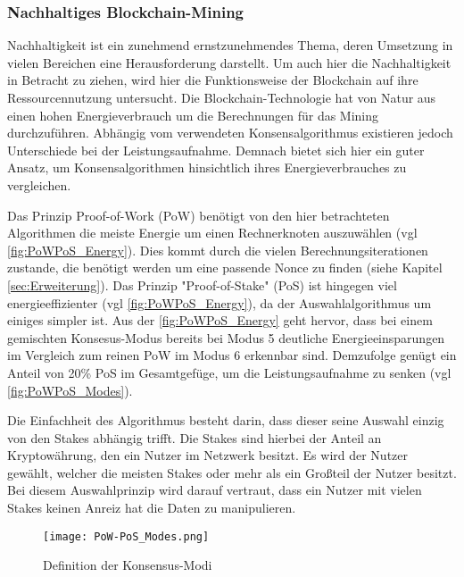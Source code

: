 \subsubsection{Nachhaltiges Blockchain-Mining}
Nachhaltigkeit ist ein zunehmend ernstzunehmendes Thema, deren Umsetzung in vielen Bereichen eine 
Herausforderung darstellt. Um auch hier die Nachhaltigkeit in Betracht zu ziehen, wird hier die 
Funktionsweise der Blockchain auf ihre Ressourcennutzung untersucht. 
Die Blockchain-Technologie hat von Natur aus einen hohen Energieverbrauch um die Berechnungen für das 
Mining durchzuführen. Abhängig vom verwendeten Konsensalgorithmus existieren jedoch Unterschiede bei 
der Leistungsaufnahme. 
\cite[p.~2]{Athar2024BC_Sustainability}
Demnach bietet sich hier ein guter Ansatz, um Konsensalgorithmen hinsichtlich ihres Energieverbrauches
zu vergleichen.

Das Prinzip \glqq Proof-of-Work\grqq{} (PoW) benötigt von den hier betrachteten Algorithmen die meiste 
Energie um einen Rechnerknoten auszuwählen (vgl \autoref{fig:PoWPoS_Energy}). Dies kommt durch die vielen 
Berechnungsiterationen zustande, die benötigt werden um eine passende Nonce zu finden 
(siehe Kapitel \ref{sec:Erweiterung}).
\newline
Das Prinzip "Proof-of-Stake" (PoS) ist hingegen viel energieeffizienter 
(vgl \autoref{fig:PoWPoS_Energy}), da der Auswahlalgorithmus um einiges simpler ist.
Aus der \autoref{fig:PoWPoS_Energy} geht hervor, dass bei einem gemischten Konsesus-Modus bereits bei 
Modus 5 deutliche Energieeinsparungen im Vergleich zum reinen PoW im Modus 6 erkennbar sind. Demzufolge genügt ein Anteil von 20\% PoS im 
Gesamtgefüge, um die Leistungsaufnahme zu senken (vgl \autoref{fig:PoWPoS_Modes}).

Die Einfachheit des Algorithmus besteht darin, dass dieser seine Auswahl einzig von den Stakes abhängig
trifft. Die Stakes sind hierbei der Anteil an Kryptowährung, den ein Nutzer im Netzwerk besitzt.
Es wird der Nutzer gewählt, welcher die meisten Stakes oder mehr als ein Gro\ss teil der Nutzer besitzt.
Bei diesem Auswahlprinzip wird darauf vertraut, dass ein Nutzer mit vielen Stakes keinen Anreiz hat die
Daten zu manipulieren.
\cite[p.280]{Nair2021Energy}





\begin{figure}[!h]
    \begin{center}
        \texttt{[image: PoW-PoS\_Modes.png]}
    \end{center}
    \caption{Definition der Konsensus-Modi}
    \label{fig:PoWPoS_Modes}
\end{figure}

